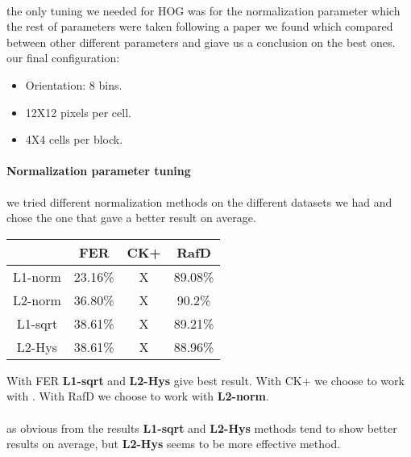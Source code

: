 \paragraph{}
the only tuning we needed for HOG was for the normalization parameter which the rest of parameters were taken following a paper\cite{HOG} we found which compared between other different parameters and giave us a conclusion on the best ones.\newline 
our final configuration: \newline
\begin{itemize}
\item Orientation: 8 bins. 
\item 12X12 pixels per cell. 
\item 4X4 cells per block.
\end{itemize}

\paragraph{Normalization parameter tuning}
we tried different normalization methods on the different datasets we had and chose the one that gave a better result on average.

\begin{center}
\begin{tabular}{ c|c|c|c }
	  & FER & CK+ & RafD \\ \hline
	 L1-norm & 23.16\% & X & 89.08\% \\  
	 L2-norm & 36.80\% & X & 90.2\% \\
	 L1-sqrt & 38.61\% & X & 89.21\% \\
	 L2-Hys & 38.61\% & X & 88.96\% \\
\end{tabular}
\end{center}
With FER \textbf{L1-sqrt} and \textbf{L2-Hys} give best result.\newline
With CK+ we choose to work with  .\newline
With RafD we choose to work with  \textbf{L2-norm}. \newline
\paragraph{}
as obvious from the results \textbf{L1-sqrt} and \textbf{L2-Hys} methods tend to show better results on average, but \textbf{L2-Hys} seems to be more effective method.
